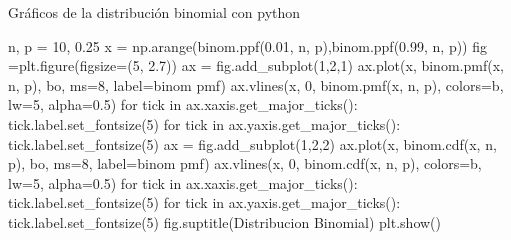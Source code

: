 \documentclass[
  ignorenonframetext,
  aspectratio=169]{beamer}
\newenvironment{Shaded}{\begin{snugshade}}{\end{snugshade}}
\newcommand{\ControlFlowTok}[1]{\textcolor[rgb]{0.00,0.23,0.31}{#1}}
\newcommand{\DecValTok}[1]{\textcolor[rgb]{0.68,0.00,0.00}{#1}}
\newcommand{\FloatTok}[1]{\textcolor[rgb]{0.68,0.00,0.00}{#1}}
\newcommand{\KeywordTok}[1]{\textcolor[rgb]{0.00,0.23,0.31}{#1}}
\newcommand{\NormalTok}[1]{\textcolor[rgb]{0.00,0.23,0.31}{#1}}
\newcommand{\OperatorTok}[1]{\textcolor[rgb]{0.37,0.37,0.37}{#1}}
\newcommand{\StringTok}[1]{\textcolor[rgb]{0.13,0.47,0.30}{#1}}
\begin{document}
\begin{frame}[fragile]{Gráficos de la distribución binomial con python}
\protect\hypertarget{gruxe1ficos-de-la-distribuciuxf3n-binomial-con-python-1}{}
\begin{Shaded}
\begin{Highlighting}[]
\NormalTok{n, p }\OperatorTok{=} \DecValTok{10}\NormalTok{, }\FloatTok{0.25}
\NormalTok{x }\OperatorTok{=}\NormalTok{ np.arange(binom.ppf(}\FloatTok{0.01}\NormalTok{, n, p),binom.ppf(}\FloatTok{0.99}\NormalTok{, n, p))}
\NormalTok{fig }\OperatorTok{=}\NormalTok{plt.figure(figsize}\OperatorTok{=}\NormalTok{(}\DecValTok{5}\NormalTok{, }\FloatTok{2.7}\NormalTok{))}
\NormalTok{ax }\OperatorTok{=}\NormalTok{ fig.add\_subplot(}\DecValTok{1}\NormalTok{,}\DecValTok{2}\NormalTok{,}\DecValTok{1}\NormalTok{)}
\NormalTok{ax.plot(x, binom.pmf(x, n, p), }\StringTok{\textquotesingle{}bo\textquotesingle{}}\NormalTok{, ms}\OperatorTok{=}\DecValTok{8}\NormalTok{, label}\OperatorTok{=}\StringTok{\textquotesingle{}binom pmf\textquotesingle{}}\NormalTok{)}
\NormalTok{ax.vlines(x, }\DecValTok{0}\NormalTok{, binom.pmf(x, n, p), colors}\OperatorTok{=}\StringTok{\textquotesingle{}b\textquotesingle{}}\NormalTok{, lw}\OperatorTok{=}\DecValTok{5}\NormalTok{, alpha}\OperatorTok{=}\FloatTok{0.5}\NormalTok{)}
\ControlFlowTok{for}\NormalTok{ tick }\KeywordTok{in}\NormalTok{ ax.xaxis.get\_major\_ticks():}
\NormalTok{  tick.label.set\_fontsize(}\DecValTok{5}\NormalTok{)}
\ControlFlowTok{for}\NormalTok{ tick }\KeywordTok{in}\NormalTok{ ax.yaxis.get\_major\_ticks():}
\NormalTok{  tick.label.set\_fontsize(}\DecValTok{5}\NormalTok{) }
\NormalTok{ax }\OperatorTok{=}\NormalTok{ fig.add\_subplot(}\DecValTok{1}\NormalTok{,}\DecValTok{2}\NormalTok{,}\DecValTok{2}\NormalTok{)}
\NormalTok{ax.plot(x, binom.cdf(x, n, p), }\StringTok{\textquotesingle{}bo\textquotesingle{}}\NormalTok{, ms}\OperatorTok{=}\DecValTok{8}\NormalTok{, label}\OperatorTok{=}\StringTok{\textquotesingle{}binom pmf\textquotesingle{}}\NormalTok{)}
\NormalTok{ax.vlines(x, }\DecValTok{0}\NormalTok{, binom.cdf(x, n, p), colors}\OperatorTok{=}\StringTok{\textquotesingle{}b\textquotesingle{}}\NormalTok{, lw}\OperatorTok{=}\DecValTok{5}\NormalTok{, alpha}\OperatorTok{=}\FloatTok{0.5}\NormalTok{)}
\ControlFlowTok{for}\NormalTok{ tick }\KeywordTok{in}\NormalTok{ ax.xaxis.get\_major\_ticks():}
\NormalTok{  tick.label.set\_fontsize(}\DecValTok{5}\NormalTok{)}
\ControlFlowTok{for}\NormalTok{ tick }\KeywordTok{in}\NormalTok{ ax.yaxis.get\_major\_ticks():}
\NormalTok{  tick.label.set\_fontsize(}\DecValTok{5}\NormalTok{)}
\NormalTok{fig.suptitle(}\StringTok{\textquotesingle{}Distribucion Binomial\textquotesingle{}}\NormalTok{)}
\NormalTok{plt.show()}
\end{Highlighting}
\end{Shaded}
\end{frame}
\end{document}
